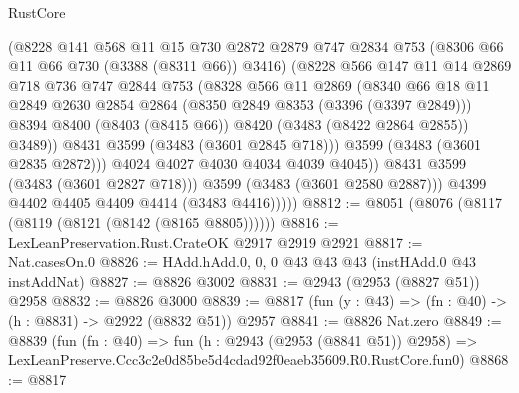 \begin{lexlean}{RustCore}
\begin{coremodule}
                    (@8228
                      @141
                      @568
                      @11
                      @15
                      @730
                      @2872
                      @2879
                      @747
                      @2834
                      @753
                      (@8306 @66 @11 @66 @730 (@3388 (@8311 @66)) @3416)
                      (@8228
                        @566
                        @147
                        @11
                        @14
                        @2869
                        @718
                        @736
                        @747
                        @2844
                        @753
                        (@8328
                          @566
                          @11
                          @2869
                          (@8340
                            @66
                            @18
                            @11
                            @2849
                            @2630
                            @2854
                            @2864
                            (@8350 @2849 @8353 (@3396 (@3397 @2849)))
                            @8394
                            @8400
                            (@8403 (@8415 @66))
                            @8420
                            (@3483 (@8422 @2864 @2855))
                            @3489))
                        @8431
                        @3599
                        (@3483 (@3601 @2845 @718)))
                      @3599
                      (@3483 (@3601 @2835 @2872)))
                    @4024
                    @4027
                    @4030
                    @4034
                    @4039
                    @4045))
                @8431
                @3599
                (@3483 (@3601 @2827 @718)))
              @3599
              (@3483 (@3601 @2580 @2887)))
            @4399
            @4402
            @4405
            @4409
            @4414
            (@3483 @4416)))))
@8812 := @8051 (@8076 (@8117 (@8119 (@8121 (@8142 (@8165 @8805))))))
@8816 := LexLeanPreservation.Rust.CrateOK @2917 @2919 @2921
@8817 := Nat.casesOn.{0}
@8826 := HAdd.hAdd.{0, 0, 0} @43 @43 @43 (instHAdd.{0} @43 instAddNat)
@8827 := @8826 @3002
@8831 := @2943 (@2953 (@8827 @51)) @2958
@8832 := @8826 @3000
@8839 := @8817 (fun (y : @43) => (fn : @40) -> (h : @8831) -> @2922 (@8832 @51)) @2957
@8841 := @8826 Nat.zero
@8849 := @8839
    (fun (fn : @40) =>
    fun (h : @2943 (@2953 (@8841 @51)) @2958) =>
    LexLeanPreserve.Ccc3c2e0d85be5d4cdad92f0eaeb35609.R0.RustCore.fun0)
@8868 := @8817

\end{coremodule}
\end{lexlean}
